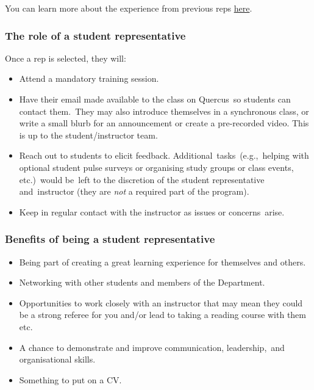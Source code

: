 \documentclass[
  openany]{book}
\begin{document}
You can learn more about the experience from previous reps \href{https://www.statistics.utoronto.ca/news/new-pilot-program-enhances-academic-experience-giving-students-voice}{here}.

\hypertarget{the-role-of-a-student-representative}{%
\subsubsection{The role of a student representative}\label{the-role-of-a-student-representative}}

Once a rep is selected, they will:

\begin{itemize}
\item
  Attend a mandatory training session.
\item
  Have their email made available to the class on Quercus~so students can contact them.~They may also introduce themselves in a synchronous class, or write a small blurb for an announcement or create a pre-recorded video. This is up to the student/instructor team.
\item
  Reach out to students to elicit feedback. Additional~tasks~(e.g.,~helping with optional student pulse surveys or organising study groups or class events, etc.)~would be~left to the discretion of the student representative and~instructor (they are \emph{not} a required part of the program).~~
\item
  Keep in regular contact with the instructor as issues or concerns~arise.
\end{itemize}

\hypertarget{benefits-of-being-a-student-representative}{%
\subsubsection{Benefits of being a student representative}\label{benefits-of-being-a-student-representative}}

\begin{itemize}
\item
  Being part of creating a great learning experience for themselves and others.
\item
  Networking with other students and members of the Department.
\item
  Opportunities to work closely with an instructor that may mean they could be a strong referee for you and/or lead to taking a reading course with them etc.
\item
  A chance to demonstrate and improve communication, leadership,~and organisational skills.
\item
  Something to put on a CV.
\end{itemize}
\end{document}
